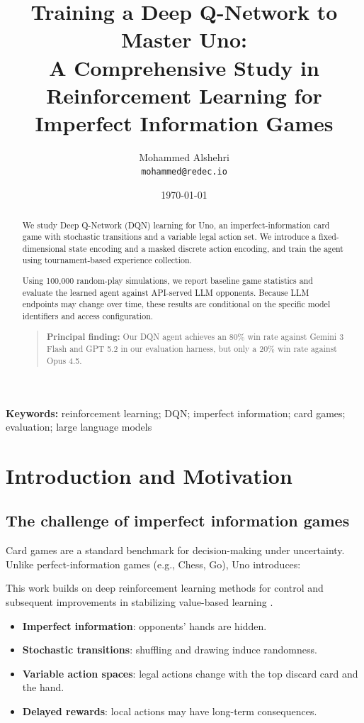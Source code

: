 \documentclass[11pt]{article}
\title{Training a Deep Q-Network to Master Uno: \\ A Comprehensive Study in Reinforcement Learning for Imperfect Information Games}
\author{Mohammed Alshehri \\ \texttt{mohammed@redec.io}}
\date{\today}
\begin{document}
\maketitle

\begin{abstract}
We study Deep Q-Network (DQN) learning for Uno, an imperfect-information card game with stochastic transitions and a variable legal action set. We introduce a fixed-dimensional state encoding and a masked discrete action encoding, and train the agent using tournament-based experience collection.

Using 100{,}000 random-play simulations, we report baseline game statistics and evaluate the learned agent against API-served LLM opponents. Because LLM endpoints may change over time, these results are conditional on the specific model identifiers and access configuration.
 
 \begin{quote}
 \textbf{Principal finding:} Our DQN agent achieves an 80\% win rate against Gemini 3 Flash and GPT 5.2 in our evaluation harness, but only a 20\% win rate against Opus 4.5.
 \end{quote}
\end{abstract}

\textbf{Keywords:} reinforcement learning; DQN; imperfect information; card games; evaluation; large language models

\section{Introduction and Motivation}
\subsection{The challenge of imperfect information games}
Card games are a standard benchmark for decision-making under uncertainty. Unlike perfect-information games (e.g., Chess, Go), Uno introduces:

This work builds on deep reinforcement learning methods for control \parencite{mnih2015human} and subsequent improvements in stabilizing value-based learning \parencite{vanhasselt2016double}.
\begin{itemize}
  \item \textbf{Imperfect information}: opponents' hands are hidden.
  \item \textbf{Stochastic transitions}: shuffling and drawing induce randomness.
  \item \textbf{Variable action spaces}: legal actions change with the top discard card and the hand.
  \item \textbf{Delayed rewards}: local actions may have long-term consequences.
\end{itemize}
\end{document}
